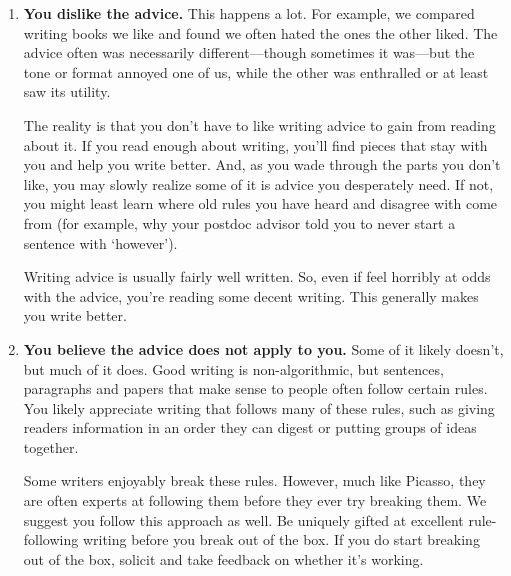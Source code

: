 \documentclass[11pt,letter]{article}
\begin{document}
\begin{enumerate}
\item {\bf You dislike the advice.} This happens a lot. For example, we compared writing books we like and found we often hated the ones the other liked. The advice often was necessarily different---though sometimes it was---but the tone or format annoyed one of us, while the other was enthralled or at least saw its utility. 

The reality is that you don't have to like writing advice to gain from reading about it. If you read enough about writing, you'll find pieces that stay with you and help you write better. And, as you wade through the parts you don't like, you may slowly realize some of it is advice you desperately need. If not, you might least learn where old rules you have heard and disagree with come from (for example, why your postdoc advisor told you to never start a sentence with `however'). %

Writing advice is usually fairly well written. So, even if feel horribly at odds with the advice, you're reading some decent writing. This generally makes you write better. 
\item {\bf You believe the advice does not apply to you.} Some of it likely doesn't, but much of it does. Good writing is non-algorithmic, but sentences, paragraphs and papers that make sense to people often follow certain rules. You likely appreciate writing that follows many of these rules, such as giving readers information in an order they can digest or putting groups of ideas together. 

Some writers enjoyably break these rules. However, much like Picasso, they are often experts at following them before they ever try breaking them. We suggest you follow this approach as well. Be uniquely gifted at excellent rule-following writing before you break out of the box. If you do start breaking out of the box, solicit and take feedback on whether it's working. 
\end{enumerate}
\end{document}
